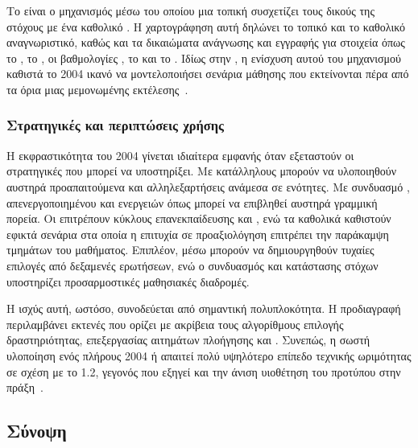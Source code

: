 Το  είναι ο μηχανισμός μέσω του οποίου μια τοπική  συσχετίζει τους δικούς της στόχους με ένα καθολικό . Η χαρτογράφηση αυτή δηλώνει το τοπικό και το καθολικό αναγνωριστικό, καθώς και τα δικαιώματα ανάγνωσης και εγγραφής για στοιχεία όπως το , το , οι βαθμολογίες , το  και το . Ιδίως στην , η ενίσχυση αυτού του μηχανισμού καθιστά το  2004 ικανό να μοντελοποιήσει σενάρια μάθησης που εκτείνονται πέρα από τα όρια μιας μεμονωμένης εκτέλεσης~\cite{ADL_SCORM2004_4thEd, ADL_SCORM_Users_Guide}.

\subsubsection{Στρατηγικές  και περιπτώσεις χρήσης}

Η εκφραστικότητα του  2004 γίνεται ιδιαίτερα εμφανής όταν εξεταστούν οι στρατηγικές που μπορεί να υποστηρίξει. Με κατάλληλους  μπορούν να υλοποιηθούν αυστηρά προαπαιτούμενα και αλληλεξαρτήσεις ανάμεσα σε ενότητες. Με συνδυασμό , απενεργοποιημένου  και ενεργειών όπως  μπορεί να επιβληθεί αυστηρά γραμμική πορεία. Οι  επιτρέπουν κύκλους επανεκπαίδευσης και , ενώ τα καθολικά  καθιστούν εφικτά  σενάρια στα οποία η επιτυχία σε προαξιολόγηση επιτρέπει την παράκαμψη τμημάτων του μαθήματος. Επιπλέον, μέσω  μπορούν να δημιουργηθούν τυχαίες επιλογές από δεξαμενές ερωτήσεων, ενώ ο συνδυασμός  και κατάστασης στόχων υποστηρίζει προσαρμοστικές μαθησιακές διαδρομές.

Η ισχύς αυτή, ωστόσο, συνοδεύεται από σημαντική πολυπλοκότητα. Η προδιαγραφή  περιλαμβάνει εκτενές  που ορίζει με ακρίβεια τους αλγορίθμους επιλογής δραστηριότητας, επεξεργασίας αιτημάτων πλοήγησης και . Συνεπώς, η σωστή υλοποίηση ενός πλήρους  2004  ή  απαιτεί πολύ υψηλότερο επίπεδο τεχνικής ωριμότητας σε σχέση με το  1.2, γεγονός που εξηγεί και την άνιση υιοθέτηση του προτύπου στην πράξη~\cite{IMS_SS_BehaviorModel, ADL_SCORM2004_SN}.

\subsection{Σύνοψη}
\label{subsec:scorm2004_summary}

